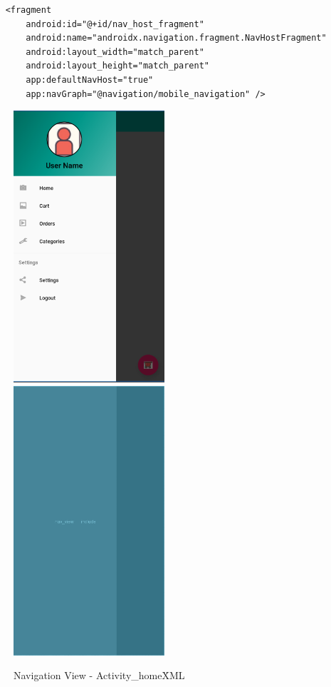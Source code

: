\begin{verbatim}
    <fragment
        android:id="@+id/nav_host_fragment"
        android:name="androidx.navigation.fragment.NavHostFragment"
        android:layout_width="match_parent"
        android:layout_height="match_parent"
        app:defaultNavHost="true"
        app:navGraph="@navigation/mobile_navigation" />
\end{verbatim}


\begin{figure}[h!]
	\caption{Navigation View - Activity\_home\.XML}
	\label{image:myImageName}
	\includegraphics[width=0.5\textwidth]{Images/nav_activity_homexml.png}
	\includegraphics[width=0.5\textwidth]{Images/nav_activity_home_view_xml.png}
\end{figure}

